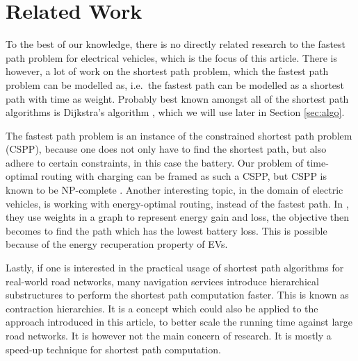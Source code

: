 \section{Related Work}\label{sec:relatedwork}
To the best of our knowledge, there is no directly related research to the fastest path problem for electrical vehicles, which is the focus of this article. There is however, a lot of work on the shortest path problem, which the fastest path problem can be modelled as, i.e.\ the fastest path can be modelled as a shortest path with time as weight. Probably best known amongst all of the shortest path algorithms is Dijkstra's algorithm \cite{dijkstra1959note}, which we will use later in Section \ref{sec:algo}.

The fastest path problem is an instance of the constrained shortest path problem (CSPP)\cite{joksch1966shortest}, because one does not only have to find the shortest path, but also adhere to certain constraints, in this case the battery. Our problem of time-optimal routing with charging can be framed as such a CSPP, but CSPP is known to be NP-complete \cite{Garey:1979:CIG:578533}. Another interesting topic, in the domain of electric vehicles, is working with energy-optimal routing, instead of the fastest path. In \cite{artmeier2010shortest}, they use weights in a graph to represent energy gain and loss, the objective then becomes to find the path which has the lowest battery loss. This is possible because of the energy recuperation property of EVs.

Lastly, if one is interested in the practical usage of shortest path algorithms for real-world road networks, many navigation services introduce hierarchical substructures to perform the shortest path computation faster. This is known as contraction hierarchies. It is a concept which could also be applied to the approach introduced in this article, to better scale the running time against large road networks. It is however not the main concern of research. It is mostly a speed-up technique for shortest path computation.